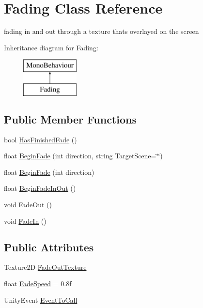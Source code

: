 \hypertarget{class_fading}{}\section{Fading Class Reference}
\label{class_fading}


fading in and out through a texture that\textquotesingle{}s overlayed on the screen  


Inheritance diagram for Fading\+:\begin{figure}[H]
\begin{center}
\leavevmode
\includegraphics[height=2.000000cm]{class_fading}
\end{center}
\end{figure}
\subsection*{Public Member Functions}
\begin{DoxyCompactItemize}
\item 
bool \mbox{\hyperlink{class_fading_a183a11289805b24a337317a338c8b488}{Has\+Finished\+Fade}} ()
\item 
float \mbox{\hyperlink{class_fading_a1de56a8439ac7fe269d28b560e43a170}{Begin\+Fade}} (int direction, string Target\+Scene=\char`\"{}\char`\"{})
\item 
float \mbox{\hyperlink{class_fading_aad79c9805adb309dfca9c35956a6539f}{Begin\+Fade}} (int direction)
\item 
float \mbox{\hyperlink{class_fading_ab7c586c60d0becec8731a5d273d5f8a4}{Begin\+Fade\+In\+Out}} ()
\item 
void \mbox{\hyperlink{class_fading_a9447dc0ed62e9aa23683d54084bba9bf}{Fade\+Out}} ()
\item 
void \mbox{\hyperlink{class_fading_a1f3938e6d5871b57282dc2eef6f6a8b7}{Fade\+In}} ()
\end{DoxyCompactItemize}
\subsection*{Public Attributes}
\begin{DoxyCompactItemize}
\item 
Texture2D \mbox{\hyperlink{class_fading_a1dfc14543e7463214e9186b592944f12}{Fade\+Out\+Texture}}
\item 
float \mbox{\hyperlink{class_fading_a8c33e07faed3d06ad034fcc17216a783}{Fade\+Speed}} = 0.\+8f
\item 
Unity\+Event \mbox{\hyperlink{class_fading_ad48fed18d4d8d59440fca235f2f61b07}{Event\+To\+Call}}
\end{DoxyCompactItemize}


